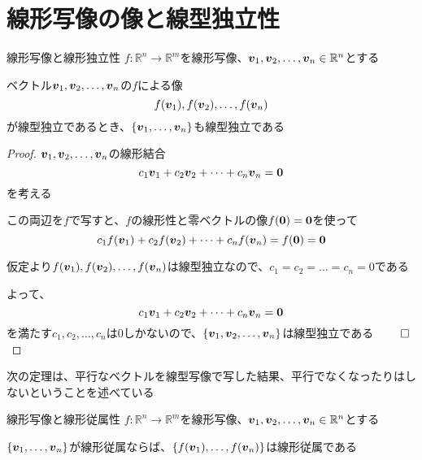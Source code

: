 \documentclass[../../../topic_linear-algebra]{subfiles}
\begin{document}
\sectionline
\section{線形写像の像と線型独立性}

\begin{theorem*}{線形写像と線形独立性}
  $f\colon \mathbb{R}^n \to \mathbb{R}^m$を線形写像、$\vb*{v}_1, \vb*{v}_2, \dots, \vb*{v}_n \in \mathbb{R}^n$とする

  ベクトル$\vb*{v}_1, \vb*{v}_2, \dots, \vb*{v}_n$の$f$による像
  \begin{equation*}
    f(\vb*{v}_1), f(\vb*{v}_2), \dots, f(\vb*{v}_n)
  \end{equation*}
  が線型独立であるとき、$\{ \vb*{v}_1, \dots, \vb*{v}_n \}$も線型独立である
\end{theorem*}

\begin{proof}
  $\vb*{v}_1, \vb*{v}_2, \dots, \vb*{v}_n$の線形結合
  \begin{equation*}
    c_1 \vb*{v}_1 + c_2 \vb*{v}_2 + \dots + c_n \vb*{v}_n = \vb*{0}
  \end{equation*}
  を考える

  この両辺を$f$で写すと、$f$の線形性と零ベクトルの像$f(\vb*{0}) = \vb*{0}$を使って
  \begin{equation*}
    c_1 f(\vb*{v}_1) + c_2 f(\vb*{v}_2) + \dots + c_n f(\vb*{v}_n) = f(\vb*{0}) = \vb*{0}
  \end{equation*}

  仮定より$f(\vb*{v}_1), f(\vb*{v}_2), \dots, f(\vb*{v}_n)$は線型独立なので、$c_1 = c_2 = \dots = c_n = 0$である

  よって、
  \begin{equation*}
    c_1 \vb*{v}_1 + c_2 \vb*{v}_2 + \dots + c_n \vb*{v}_n = \vb*{0}
  \end{equation*}
  を満たす$c_1, c_2, \dots, c_n$は0しかないので、$\{ \vb*{v}_1, \vb*{v}_2, \dots, \vb*{v}_n \}$は線型独立である $\qed$
\end{proof}

\sectionline

次の定理は、平行なベクトルを線型写像で写した結果、平行でなくなったりはしないということを述べている

\begin{theorem*}{線形写像と線形従属性}
  $f\colon \mathbb{R}^n \to \mathbb{R}^m$を線形写像、$\vb*{v}_1, \vb*{v}_2, \dots, \vb*{v}_n \in \mathbb{R}^n$とする

  $\{\vb*{v}_1, \dots, \vb*{v}_n\}$が線形従属ならば、$\{ f(\vb*{v}_1),  \dots, f(\vb*{v}_n) \}$は線形従属である
\end{theorem*}
\end{document}
